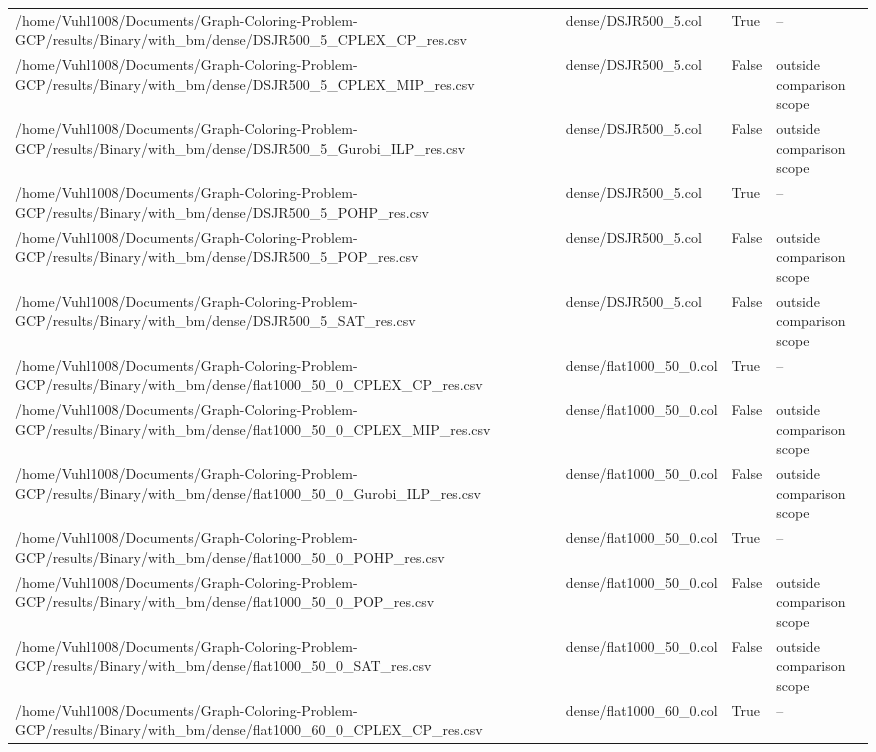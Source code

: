 \begin{table}[htbp]
\begin{tabular}{llll}
/home/Vuhl1008/Documents/Graph-Coloring-Problem-GCP/results/Binary/with\_bm/dense/DSJR500\_5\_CPLEX\_CP\_res.csv & dense/DSJR500\_5.col & True & -- \\
/home/Vuhl1008/Documents/Graph-Coloring-Problem-GCP/results/Binary/with\_bm/dense/DSJR500\_5\_CPLEX\_MIP\_res.csv & dense/DSJR500\_5.col & False & outside comparison scope \\
/home/Vuhl1008/Documents/Graph-Coloring-Problem-GCP/results/Binary/with\_bm/dense/DSJR500\_5\_Gurobi\_ILP\_res.csv & dense/DSJR500\_5.col & False & outside comparison scope \\
/home/Vuhl1008/Documents/Graph-Coloring-Problem-GCP/results/Binary/with\_bm/dense/DSJR500\_5\_POHP\_res.csv & dense/DSJR500\_5.col & True & -- \\
/home/Vuhl1008/Documents/Graph-Coloring-Problem-GCP/results/Binary/with\_bm/dense/DSJR500\_5\_POP\_res.csv & dense/DSJR500\_5.col & False & outside comparison scope \\
/home/Vuhl1008/Documents/Graph-Coloring-Problem-GCP/results/Binary/with\_bm/dense/DSJR500\_5\_SAT\_res.csv & dense/DSJR500\_5.col & False & outside comparison scope \\
/home/Vuhl1008/Documents/Graph-Coloring-Problem-GCP/results/Binary/with\_bm/dense/flat1000\_50\_0\_CPLEX\_CP\_res.csv & dense/flat1000\_50\_0.col & True & -- \\
/home/Vuhl1008/Documents/Graph-Coloring-Problem-GCP/results/Binary/with\_bm/dense/flat1000\_50\_0\_CPLEX\_MIP\_res.csv & dense/flat1000\_50\_0.col & False & outside comparison scope \\
/home/Vuhl1008/Documents/Graph-Coloring-Problem-GCP/results/Binary/with\_bm/dense/flat1000\_50\_0\_Gurobi\_ILP\_res.csv & dense/flat1000\_50\_0.col & False & outside comparison scope \\
/home/Vuhl1008/Documents/Graph-Coloring-Problem-GCP/results/Binary/with\_bm/dense/flat1000\_50\_0\_POHP\_res.csv & dense/flat1000\_50\_0.col & True & -- \\
/home/Vuhl1008/Documents/Graph-Coloring-Problem-GCP/results/Binary/with\_bm/dense/flat1000\_50\_0\_POP\_res.csv & dense/flat1000\_50\_0.col & False & outside comparison scope \\
/home/Vuhl1008/Documents/Graph-Coloring-Problem-GCP/results/Binary/with\_bm/dense/flat1000\_50\_0\_SAT\_res.csv & dense/flat1000\_50\_0.col & False & outside comparison scope \\
/home/Vuhl1008/Documents/Graph-Coloring-Problem-GCP/results/Binary/with\_bm/dense/flat1000\_60\_0\_CPLEX\_CP\_res.csv & dense/flat1000\_60\_0.col & True & -- \\

\end{tabular}
\end{table}
